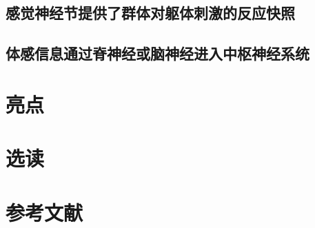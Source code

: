 \subsection{感觉神经节提供了群体对躯体刺激的反应快照}
\subsection{体感信息通过脊神经或脑神经进入中枢神经系统}

\section{亮点}

\section{选读}

\section{参考文献}
